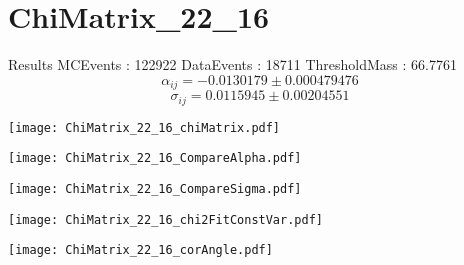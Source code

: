 \documentclass[a4paper,12pt]{article}
\begin{document}
\section{ChiMatrix\_22\_16}
\begin{minipage}{0.49\linewidth} Results \newline
MCEvents : 122922\newline
DataEvents : 18711 \newline
ThresholdMass : 66.7761\\
$$\alpha_{ij} = -0.0130179\pm 0.000479476$$
$$\sigma_{ij} = 0.0115945\pm 0.00204551$$
\end{minipage}\hfill
\begin{minipage}{0.49\linewidth} 
\texttt{[image: ChiMatrix\_22\_16\_chiMatrix.pdf]}\\
\end{minipage}
\hfill
\begin{minipage}{0.49\linewidth} 
\texttt{[image: ChiMatrix\_22\_16\_CompareAlpha.pdf]}\\
\end{minipage}
\hfill
\begin{minipage}{0.49\linewidth} 
\texttt{[image: ChiMatrix\_22\_16\_CompareSigma.pdf]}\\
\end{minipage}
\begin{minipage}{0.49\linewidth} 
\texttt{[image: ChiMatrix\_22\_16\_chi2FitConstVar.pdf]}\\
\end{minipage}
\hfill
\begin{minipage}{0.49\linewidth} 
\texttt{[image: ChiMatrix\_22\_16\_corAngle.pdf]}\\
\end{minipage}
\end{document}
